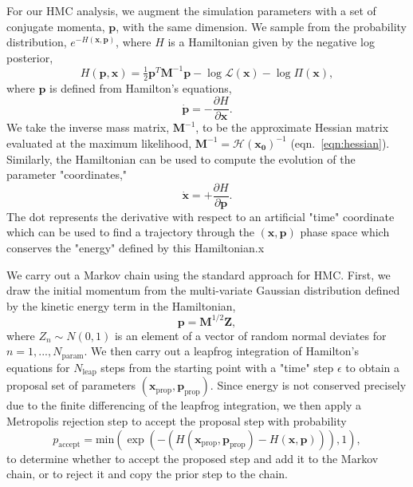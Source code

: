 \documentclass[fleqn,usenatbib]{mnras} %
\begin{document}

For our HMC analysis, we augment the simulation parameters with a set of conjugate momenta, $\mathbf{p}$, with the same dimension. We sample from the probability distribution, $e^{-H(\mathbf{x},\mathbf{p})}$, where $H$ is a Hamiltonian given by the negative log posterior,
\begin{equation}
    H(\mathbf{p},\mathbf{x}) = \tfrac{1}{2} \mathbf{p}^T \mathbf{M}^{-1} \mathbf{p}
    - \log{\mathcal{L}}(\mathbf{x}) - \log{\Pi(\mathbf{x})},
\end{equation}
where $\mathbf{p}$ is defined from Hamilton's equations,
\begin{equation}
    \dot{\mathbf{p}} = -\frac{\partial H}{\partial \mathbf{x}}.
\end{equation}
We take the inverse mass matrix, $\mathbf{M}^{-1}$, to be the approximate Hessian matrix evaluated at the maximum likelihood, $\mathbf{M}^{-1} = \mathbf{\mathcal{H}(\mathbf{x}_0)}^{-1}$ (eqn.\ \ref{eqn:hessian}).
Similarly, the Hamiltonian can be used to compute the evolution of the parameter "coordinates,"
\begin{equation}
    \dot{\mathbf{x}} = +\frac{\partial H}{\partial \mathbf{p}}.
\end{equation}
The dot represents the derivative with respect to an artificial "time" coordinate which can be used to find a trajectory through the $(\mathbf{x},\mathbf{p})$ phase space which conserves the "energy" defined by this Hamiltonian.x

We carry out a Markov chain using the standard approach for HMC. First, we draw the initial momentum from the multi-variate Gaussian distribution defined by the kinetic energy term in the Hamiltonian,
\begin{equation}
    \mathbf{p} = \mathbf{M}^{1/2} \mathbf{Z},
\end{equation}
where $Z_n \sim N(0,1)$ is an element of a vector of random normal deviates for $n=1,...,N_\mathrm{param}$.
We then carry out a leapfrog integration of Hamilton's equations for $N_\mathrm{leap}$ steps from the starting point with a "time" step $\epsilon$ to obtain a proposal set of parameters $(\mathbf{x}_\mathrm{prop},\mathbf{p}_\mathrm{prop})$.  Since energy is not conserved precisely due to the finite differencing of the leapfrog integration, we then apply a Metropolis rejection step to accept the proposal step with probability
\begin{equation}
    p_\mathrm{accept} = \mathrm{min}(\exp(-(H(\mathbf{x}_\mathrm{prop},\mathbf{p}_\mathrm{prop}) - H(\mathbf{x},\mathbf{p}))),1),
\end{equation}
to determine whether to accept the proposed step and add it to the Markov chain, or to reject it and copy the prior step to the chain.
\end{document}
